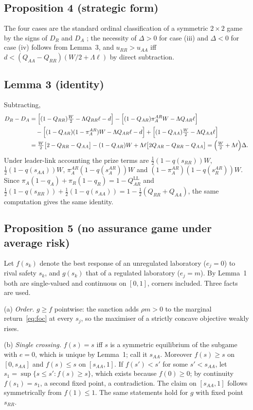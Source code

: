\documentclass[11pt]{article}
\theoremstyle{plain}
\theoremstyle{definition}
\theoremstyle{remark}
\newcommand{\Lam}{\Lambda}
\newcommand{\Delt}{\Delta}
\begin{document}
\subsection{Proposition 4 (strategic form)}
The four cases are the standard ordinal classification of a symmetric $2\times2$ game by the signs of $D_R$ and $D_A$ \citep{snyder1971}; the necessity of $\Delt>0$ for case (iii) and $\Delt<0$ for case (iv) follows from Lemma~3, and $u_{RR}>u_{AA}$ iff $d<(Q_{AA}-Q_{RR})(W/2+\Lam\ell)$ by direct subtraction.

\subsection{Lemma 3 (identity)}
Subtracting,
\begin{align*}
D_R-D_A&=\Bigl[(1-Q_{RR})\tfrac W2-\Lam Q_{RR}\ell-d\Bigr]-\Bigl[(1-Q_{AR})\pi^{AR}_AW-\Lam Q_{AR}\ell\Bigr]\\
&\quad-\Bigl[(1-Q_{AR})(1-\pi^{AR}_A)W-\Lam Q_{AR}\ell-d\Bigr]+\Bigl[(1-Q_{AA})\tfrac W2-\Lam Q_{AA}\ell\Bigr]\\
&=\tfrac W2\bigl[2-Q_{RR}-Q_{AA}\bigr]-(1-Q_{AR})W+\Lam\ell\bigl[2Q_{AR}-Q_{RR}-Q_{AA}\bigr]
=\Bigl(\tfrac W2+\Lam\ell\Bigr)\Delt.
\end{align*}
Under leader-link accounting the prize terms are $\tfrac12(1-q(s_{RR}))W$, $\tfrac12(1-q(s_{AA}))W$, $\pi^{AR}_A(1-q(s^{AR}_A))W$ and $(1-\pi^{AR}_A)(1-q(s^{AR}_R))W$. Since $\pi_A(1-q_A)+\pi_R(1-q_R)=1-Q^{\mathrm{LL}}_{AR}$ and $\tfrac12(1-q(s_{RR}))+\tfrac12(1-q(s_{AA}))=1-\tfrac12(Q_{RR}+Q_{AA})$, the same computation gives the same identity.

\subsection{Proposition 5 (no assurance game under average risk)}
Let $f(s_k)$ denote the best response of an unregulated laboratory ($e_j=0$) to rival safety $s_k$, and $g(s_k)$ that of a regulated laboratory ($e_j=m$). By Lemma~1 both are single-valued and continuous on $[0,1]$, corners included. Three facts are used.

(a) \emph{Order.} $g\ge f$ pointwise: the sanction adds $\rho m>0$ to the marginal return~\eqref{eq:foc} at every $s_j$, so the maximiser of a strictly concave objective weakly rises.

(b) \emph{Single crossing.} $f(s)=s$ iff $s$ is a symmetric equilibrium of the subgame with $e=0$, which is unique by Lemma~1; call it $s_{AA}$. Moreover $f(s)\ge s$ on $[0,s_{AA}]$ and $f(s)\le s$ on $[s_{AA},1]$. If $f(s')<s'$ for some $s'<s_{AA}$, let $s_1=\sup\{s\le s':f(s)\ge s\}$, which exists because $f(0)\ge0$; by continuity $f(s_1)=s_1$, a second fixed point, a contradiction. The claim on $[s_{AA},1]$ follows symmetrically from $f(1)\le1$. The same statements hold for $g$ with fixed point $s_{RR}$.
\end{document}

